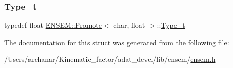 \subsubsection{\texorpdfstring{Type\_t}{Type\_t}\hspace{0.1cm}{\footnotesize\ttfamily [2/2]}}
{\footnotesize\ttfamily typedef float \mbox{\hyperlink{structENSEM_1_1Promote}{E\+N\+S\+E\+M\+::\+Promote}}$<$ char, float $>$\+::\mbox{\hyperlink{structENSEM_1_1Promote_3_01char_00_01float_01_4_ab888f85116b883e8bcc31eb0c1a7a6da}{Type\+\_\+t}}}



The documentation for this struct was generated from the following file\+:\begin{DoxyCompactItemize}
\item 
/\+Users/archanar/\+Kinematic\+\_\+factor/adat\+\_\+devel/lib/ensem/\mbox{\hyperlink{lib_2ensem_2ensem_8h}{ensem.\+h}}\end{DoxyCompactItemize}
